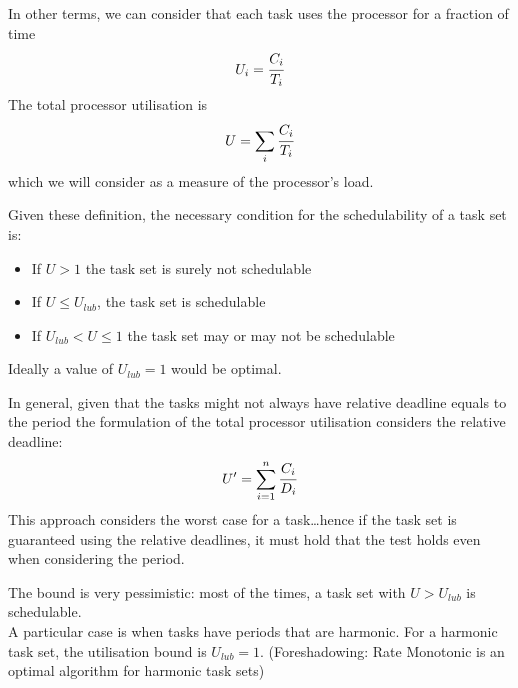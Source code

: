 In other terms, we can consider that each task uses the processor for a fraction of time 
\[U_i = \cfrac{C_i}{T_i}\]
The total processor utilisation is
\[U = \sum_i \cfrac{C_i}{T_i}\]
which we will consider as a measure of the processor's load.

Given these definition, the necessary condition for the schedulability of a task set is:
\begin{itemize}
    \item If $U>1$ the task set is surely not schedulable
    \item If $U\le U_{lub}$, the task set is schedulable
    \item If $U_{lub}<U \le 1$ the task set may or may not be schedulable
\end{itemize}
Ideally a value of $U_{lub} = 1$ would be optimal.

In general, given that the tasks might not always have relative deadline equals to the period the formulation of the total processor utilisation considers the relative deadline:
\[U' = \sum_{i=1}^n \cfrac{C_i}{D_i}\]
This approach considers the worst case for a task\dots hence if the task set is guaranteed using the relative deadlines, it must hold that the test holds even when considering the period.

The bound is very pessimistic: most of the times, a task set with $U>U_{lub}$ is schedulable.\\
A particular case is when tasks have periods that are harmonic.
For a harmonic task set, the utilisation bound is $U_{lub} = 1$.
(Foreshadowing: Rate Monotonic is an optimal algorithm for harmonic task sets)
